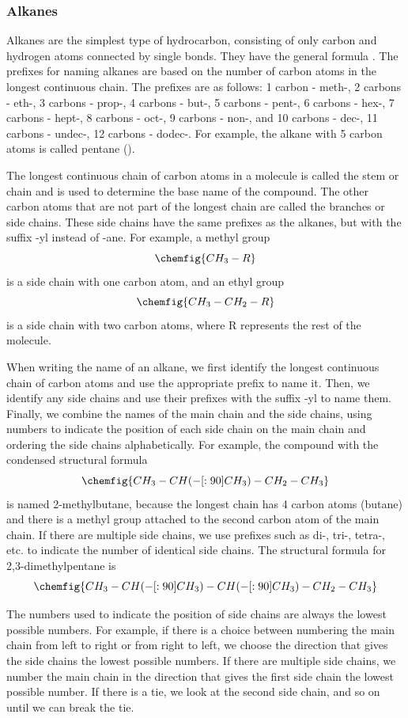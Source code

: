 \subsubsection{Alkanes}
Alkanes are the simplest type of hydrocarbon, consisting of only carbon and hydrogen atoms connected by single bonds. They have the general formula . The prefixes for naming alkanes are based on the number of carbon atoms in the longest continuous chain. The prefixes are as follows: 1 carbon - meth-, 2 carbons - eth-, 3 carbons - prop-, 4 carbons - but-, 5 carbons - pent-, 6 carbons - hex-, 7 carbons - hept-, 8 carbons - oct-, 9 carbons - non-, and 10 carbons - dec-, 11 carbons - undec-, 12 carbons - dodec-. For example, the alkane with 5 carbon atoms is called pentane (). 

The longest continuous chain of carbon atoms in a molecule is called the stem or chain and is used to determine the base name of the compound. The other carbon atoms that are not part of the longest chain are called the branches or side chains. These side chains have the same prefixes as the alkanes, but with the suffix -yl instead of -ane. For example, a methyl group 
\[\chemfig{CH_3 - R}\] is a side chain with one carbon atom, and an ethyl group
\[\chemfig{CH_3 - CH_2 - R}\] is a side chain with two carbon atoms, where R represents the rest of the molecule.

When writing the name of an alkane, we first identify the longest continuous chain of carbon atoms and use the appropriate prefix to name it. Then, we identify any side chains and use their prefixes with the suffix -yl to name them. Finally, we combine the names of the main chain and the side chains, using numbers to indicate the position of each side chain on the main chain and ordering the side chains alphabetically. For example, the compound with the condensed structural formula 
\[\chemfig{CH_3-CH(-[:90]CH_3)-CH_2-CH_3}\] 
is named 2-methylbutane, because the longest chain has 4 carbon atoms (butane) and there is a methyl group attached to the second carbon atom of the main chain. If there are multiple side chains, we use prefixes such as di-, tri-, tetra-, etc. to indicate the number of identical side chains. The structural formula for 2,3-dimethylpentane is
\[\chemfig{CH_3-CH(-[:90]CH_3)-CH(-[:90]CH_3)-CH_2-CH_3}\]

The numbers used to indicate the position of side chains are always the lowest possible numbers. For example, if there is a choice between numbering the main chain from left to right or from right to left, we choose the direction that gives the side chains the lowest possible numbers. If there are multiple side chains, we number the main chain in the direction that gives the first side chain the lowest possible number. If there is a tie, we look at the second side chain, and so on until we can break the tie. 

